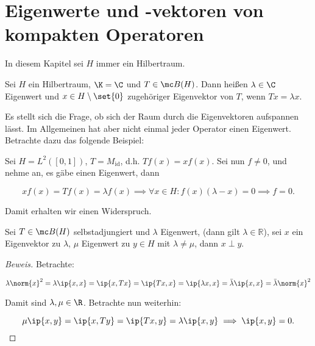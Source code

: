 \section{Eigenwerte und -vektoren von kompakten Operatoren}

In diesem Kapitel sei $H$ immer ein Hilbertraum.


\begin{definition}
	
	Sei $H$ ein Hilbertraum, $\K = \C$ und $T \in \mc B(H)$. Dann heißen $\lambda \in \C$ Eigenwert und $x \in H \setminus \set{0}$ zugehöriger Eigenvektor von $T$, wenn $Tx = \lambda x$.
	
\end{definition}


\begin{rem}
	
	Es stellt sich die Frage, ob sich der Raum durch die Eigenvektoren aufspannen lässt. Im Allgemeinen hat aber nicht einmal jeder Operator einen Eigenwert. Betrachte dazu das folgende Beispiel:
	
\end{rem}


\begin{ex}
	
	Sei $H = L^2([0, 1])$, $T = M_{\text{id}}$, d.h. $Tf(x) = xf(x)$. Sei nun $f \not= 0$, und nehme an, es gäbe einen Eigenwert, dann
	
	\[ xf(x) = Tf(x) = \lambda f(x) \implies \forall x \in H: f(x)(\lambda - x) = 0 \implies f = 0. \]
	
	Damit erhalten wir einen Widerspruch.
	
\end{ex}


\begin{theorem}
	\label{real_ev}
	Sei $T \in \mc B(H)$ selbstadjungiert und $\lambda$ Eigenwert, (dann gilt $\lambda \in \mathbb{R}$), sei $x$ ein Eigenvektor zu $\lambda$, $\mu$ Eigenwert zu $y \in H$ mit $\lambda \not= \mu$, dann $x \perp y$.
	
	\begin{proof}[Beweis]
		
		Betrachte:
		
		\[ \lambda \norm{x}^2 =\lambda \ip{x, x} = \ip{x, Tx} = \ip{Tx, x} = \ip{\lambda x, x} = \bar\lambda \ip{x, x} = \bar\lambda \norm{x}^2 \]
		
		
		Damit sind $\lambda, \mu \in \R$. Betrachte nun weiterhin:
		
		\[ \mu \ip{x, y} = \ip{x, Ty} = \ip{Tx, y} = \lambda \ip{x, y} \implies \ip{x, y} = 0. \]
		
	\end{proof}
	
\end{theorem}



